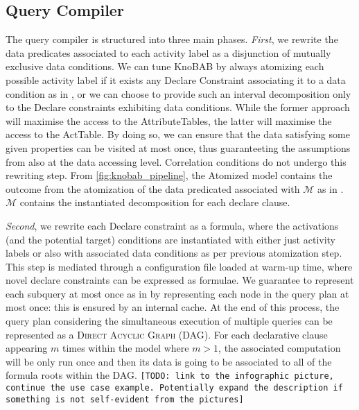 \subsection{Query Compiler}\label{sec:qc}
The query compiler is structured into three main phases. \textit{First}, we rewrite the data predicates 
associated to each activity label as a 
disjunction of mutually exclusive data conditions. We can tune KnoBAB by always atomizing each possible activity label if it exists any Declare Constraint associating it to a data condition as in \cite{bpm21}, or we can choose to provide such an interval decomposition only to the Declare constraints exhibiting data conditions. While the former approach will maximise the access to the \textsf{AttributeTable}s, the latter will maximise the access to the \textsf{ActTable}. By doing so, we can ensure that the data satisfying some given properties can be visited at most once, thus guaranteeting the assumptions from \cite{BellatrecheKB21} also at the data accessing level. Correlation conditions do not undergo this rewriting step. From \figurename\ref{fig:knobab_pipeline}, the Atomized model contains the outcome from the atomization of the data predicated associated with $\mathcal{M}$ as in \cite{bpm21}. $\mathcal{M}$ contains the instantiated decomposition for each declare clause.

\textit{Second}, we rewrite each Declare constraint as a \xLTLf formula, where the activations (and the potential target) conditions are instantiated with either just activity labels or also with associated data conditions as per previous atomization step. This step is mediated through a configuration file loaded at warm-up time, where novel declare constraints can be expressed as \xLTLf formulae. We guarantee to represent each subquery at most once as in \cite{BellatrecheKB21} by representing each node in the query plan at most once: this is ensured by an internal cache. At the end of this process, the query plan considering the simultaneous execution of multiple queries can be represented as a \textsc{Direct Acyclic Graph} (DAG).  For each declarative clause appearing $m$ times within the model where $m>1$, the associated computation will be only run once and then its data is going to be associated to all of the \xLTLf formula roots within the DAG. \texttt{\color{red}[TODO: link to the infographic picture, continue the use case example. Potentially expand the description if something is not self-evident from the pictures]}

